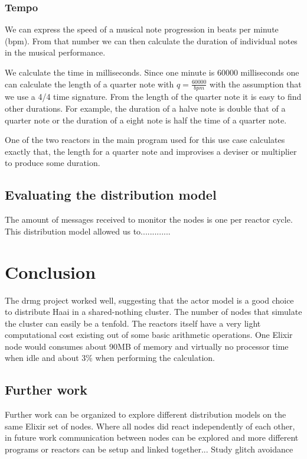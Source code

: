 \documentclass[a4paper]{book}
\begin{document}
\subsection*{Tempo}
We can express the speed of a musical note progression in beats per minute (bpm). From that number we can then calculate the duration of individual notes in the musical performance. 

We calculate the time in milliseconds. Since one minute is 60000 milliseconds one can calculate the length of a quarter note with \(q = \frac{60000}{bpm}\) with the assumption that we use a 4/4 time signature. From the length of the quarter note it is easy to find other durations. For example, the duration of a halve note is double that of a quarter note or the duration of a eight note is half the time of a quarter note.

One of the two reactors in the main program used for this use case calculates exactly that, the length for a quarter note and improvises a deviser or multiplier to produce some duration. 

\section{Evaluating the distribution model}
The amount of messages received to monitor the nodes is one per reactor cycle. This distribution model allowed us to.............
\chapter{Conclusion}
The drmg project worked well, suggesting that the actor model is a good choice to distribute Haai in a shared-nothing cluster. The number of nodes that simulate the cluster can easily be a tenfold. The reactors itself have a very light computational cost existing out of some basic arithmetic operations. One Elixir node would consumes about 90MB of memory and virtually no processor time when idle and about 3\% when performing the calculation.

\section{Further work}
Further work can be organized to explore different distribution models on the same Elixir set of nodes. Where all nodes did react independently of each other, in future work communication between nodes can be explored and more different programs or reactors can be setup and linked together...
Study glitch avoidance 

\printbibliography
\end{document}
